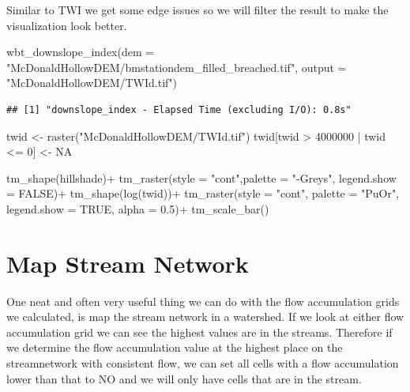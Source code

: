 \documentclass[
]{book}
\newenvironment{Shaded}{\begin{snugshade}}{\end{snugshade}}
\newcommand{\AttributeTok}[1]{\textcolor[rgb]{0.77,0.63,0.00}{#1}}
\newcommand{\ConstantTok}[1]{\textcolor[rgb]{0.00,0.00,0.00}{#1}}
\newcommand{\DecValTok}[1]{\textcolor[rgb]{0.00,0.00,0.81}{#1}}
\newcommand{\FloatTok}[1]{\textcolor[rgb]{0.00,0.00,0.81}{#1}}
\newcommand{\FunctionTok}[1]{\textcolor[rgb]{0.00,0.00,0.00}{#1}}
\newcommand{\NormalTok}[1]{#1}
\newcommand{\OtherTok}[1]{\textcolor[rgb]{0.56,0.35,0.01}{#1}}
\newcommand{\SpecialCharTok}[1]{\textcolor[rgb]{0.00,0.00,0.00}{#1}}
\newcommand{\StringTok}[1]{\textcolor[rgb]{0.31,0.60,0.02}{#1}}
\begin{document}
Similar to TWI we get some edge issues so we will filter the result to make the visualization look better.

\begin{Shaded}
\begin{Highlighting}[]
\FunctionTok{wbt\_downslope\_index}\NormalTok{(}\AttributeTok{dem =} \StringTok{"McDonaldHollowDEM/bmstationdem\_filled\_breached.tif"}\NormalTok{,}
                    \AttributeTok{output =} \StringTok{"McDonaldHollowDEM/TWId.tif"}\NormalTok{)}
\end{Highlighting}
\end{Shaded}

\begin{verbatim}
## [1] "downslope_index - Elapsed Time (excluding I/O): 0.8s"
\end{verbatim}

\begin{Shaded}
\begin{Highlighting}[]
\NormalTok{twid }\OtherTok{\textless{}{-}} \FunctionTok{raster}\NormalTok{(}\StringTok{"McDonaldHollowDEM/TWId.tif"}\NormalTok{)}
\NormalTok{twid[twid }\SpecialCharTok{\textgreater{}} \DecValTok{4000000} \SpecialCharTok{|}\NormalTok{ twid }\SpecialCharTok{\textless{}=} \DecValTok{0}\NormalTok{] }\OtherTok{\textless{}{-}} \ConstantTok{NA}

\FunctionTok{tm\_shape}\NormalTok{(hillshade)}\SpecialCharTok{+}
  \FunctionTok{tm\_raster}\NormalTok{(}\AttributeTok{style =} \StringTok{"cont"}\NormalTok{,}\AttributeTok{palette =} \StringTok{"{-}Greys"}\NormalTok{, }\AttributeTok{legend.show =} \ConstantTok{FALSE}\NormalTok{)}\SpecialCharTok{+}
\FunctionTok{tm\_shape}\NormalTok{(}\FunctionTok{log}\NormalTok{(twid))}\SpecialCharTok{+}
  \FunctionTok{tm\_raster}\NormalTok{(}\AttributeTok{style =} \StringTok{"cont"}\NormalTok{, }\AttributeTok{palette =} \StringTok{"PuOr"}\NormalTok{, }\AttributeTok{legend.show =} \ConstantTok{TRUE}\NormalTok{, }\AttributeTok{alpha =} \FloatTok{0.5}\NormalTok{)}\SpecialCharTok{+}
  \FunctionTok{tm\_scale\_bar}\NormalTok{()}
\end{Highlighting}
\end{Shaded}

\hypertarget{map-stream-network}{%
\section{Map Stream Network}\label{map-stream-network}}

One neat and often very useful thing we can do with the flow accumulation grids we calculated, is map the stream network in a watershed. If we look at either flow accumulation grid we can see the highest values are in the streams. Therefore if we determine the flow accumulation value at the highest place on the streamnetwork with consistent flow, we can set all cells with a flow accumulation lower than that to NO and we will only have cells that are in the stream.
\end{document}
